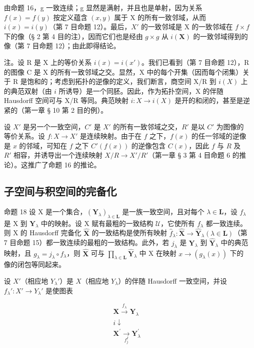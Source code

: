 由命题 16，g 一致连续；g 显然是满射，并且也是单射，因为关系 \(f(x) = f(y)\) 按定义蕴含 \((x,y)\) 属于 X 的所有一致邻域，从而 \(i(x)=i(y)\)（第 7 目命题 12）。最后，\(X'\) 的一致邻域是 X 的一致邻域在 \(f\times f\) 下的像（§ 2 第 4 目的注），因而它们也是经由 \(g\times g\) 从 \(i(\mathbf{X})\) 的一致邻域得到的像（第 7 目命题 12）；由此即得结论。

注。设 R 是 X 上的等价关系 \(i(x) = i(x')\)。我们已看到（第 7 目命题 12），R 的图像 C 是 X 的所有一致邻域之交。显然，X 中的每个开集（因而每个闭集）关于 R 是饱和的；考虑到拓扑的逆像的定义，我们断言，商空间 X/R 到 \(i(X)\) 上的典范双射（由 \(i\) 所诱导）是一个同胚。因此，作为拓扑空间，X 的伴随 Hausdorff 空间可与 X/R 等同。典范映射 \(i: X \to i(X)\) 是开的和闭的，甚至是逆紧的（第一章 § 10 第 2 目的例）。

设 \(X'\) 是另一个一致空间，\(C'\) 是 \(X'\) 的所有一致邻域之交，\(R'\) 是以 \(C'\) 为图像的等价关系。设 \(f: X \to X'\) 是连续映射。由于在 \(f\) 之下，\(f(x)\) 的任一邻域的逆像是 \(x\) 的邻域，可知在 \(f\) 之下 \(C'(f(x))\) 的逆像包含 \(C(x)\)，因此 \(f\) 与 \(R\) 及 \(R'\) 相容，并诱导出一个连续映射 \(X/R \to X'/R'\)（第一章 § 3 第 4 目命题 6 的推论）。这推广了命题 16 的推论。

\subsection{子空间与积空间的完备化}

命题 18 设 X 是一个集合，\((\mathbf{Y}_{\lambda})_{\lambda \in \mathbf{L}}\) 是一族一致空间，且对每个 \(\lambda \in \mathbf{L}\)，设 \(f_{\lambda}\) 是 X 到 \(\mathbf{Y}_{\lambda}\) 中的映射。设 X 赋有最粗的一致结构 \(\mathcal{U}\)，它使所有 \(f_{\lambda}\) 都一致连续。则 X 的 Hausdorff 完备化 \(\hat{\mathbf{X}}\) 的一致结构是使所有映射 \(\hat{f}_{\lambda} \colon \hat{\mathbf{X}} \to \hat{\mathbf{Y}}_{\lambda} (\lambda \in \mathbf{L})\)（第 7 目命题 15）都一致连续的最粗的一致结构。此外，若 \(j_{\lambda}\) 是 \(\mathbf{Y}_{\lambda}\) 到 \(\hat{\mathbf{Y}}_{\lambda}\) 中的典范映射，且 \(g_{\lambda} = j_{\lambda} \circ f_{\lambda}\)，则 \(\hat{\mathbf{X}}\) 可与 \(\prod_{\lambda \in \mathbf{L}} \hat{\mathbf{Y}}_{\lambda}\) 中 X 在映射 \(x \to (g_{\lambda}(x))\) 下的像的闭包等同起来。

设 \(X'\)（相应地 \(Y_{\lambda}'\)）是 \(X\)（相应地 \(Y_{\lambda}\)）的伴随 Hausdorff 一致空间，并设 \(f_{\lambda}' \colon X' \to Y_{\lambda}'\) 是使图表

\[
\begin{array}{c} \mathbf {X} \xrightarrow {f _ {\lambda}} \mathbf {Y} _ {\lambda} \\ i \downarrow \\ \mathbf {X ^ {\prime}} \xrightarrow [ f _ {j} ^ {I} ]{} \mathbf {Y} _ {\lambda} ^ {\prime} \end{array}
\]

